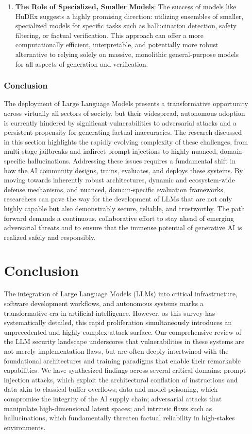 \documentclass[11pt,a4paper]{article}
\begin{document}
\begin{enumerate}
  \item \textbf{The Role of Specialized, Smaller Models}: The success of models like HuDEx \cite{Lee_2025_LLM} suggests a highly promising direction: utilizing ensembles of smaller, specialized models for specific tasks such as hallucination detection, safety filtering, or factual verification. This approach can offer a more computationally efficient, interpretable, and potentially more robust alternative to relying solely on massive, monolithic general-purpose models for all aspects of generation and verification.
\end{enumerate}
\subsubsection{Conclusion}

The deployment of Large Language Models presents a transformative opportunity across virtually all sectors of society, but their widespread, autonomous adoption is currently hindered by significant vulnerabilities to adversarial attacks and a persistent propensity for generating factual inaccuracies. The research discussed in this section highlights the rapidly evolving complexity of these challenges, from multi-stage jailbreaks and indirect prompt injections to highly nuanced, domain-specific hallucinations. Addressing these issues requires a fundamental shift in how the AI community designs, trains, evaluates, and deploys these systems. By moving towards inherently robust architectures, dynamic and ecosystem-wide defense mechanisms, and nuanced, domain-specific evaluation frameworks, researchers can pave the way for the development of LLMs that are not only highly capable but also demonstrably secure, reliable, and trustworthy. The path forward demands a continuous, collaborative effort to stay ahead of emerging adversarial threats and to ensure that the immense potential of generative AI is realized safely and responsibly.

\section{Conclusion}

The integration of Large Language Models (LLMs) into critical infrastructure, software development workflows, and autonomous systems marks a transformative era in artificial intelligence. However, as this survey has systematically detailed, this rapid proliferation simultaneously introduces an unprecedented and highly complex attack surface. Our comprehensive review of the LLM security landscape underscores that vulnerabilities in these systems are not merely implementation flaws, but are often deeply intertwined with the foundational architectures and training paradigms that enable their remarkable capabilities. We have synthesized findings across several critical domains: prompt injection attacks, which exploit the architectural conflation of instructions and data akin to classical buffer overflows; data and model poisoning, which compromise the integrity of the AI supply chain; adversarial attacks that manipulate high-dimensional latent spaces; and intrinsic flaws such as hallucinations, which fundamentally threaten factual reliability in high-stakes environments.
\end{document}
